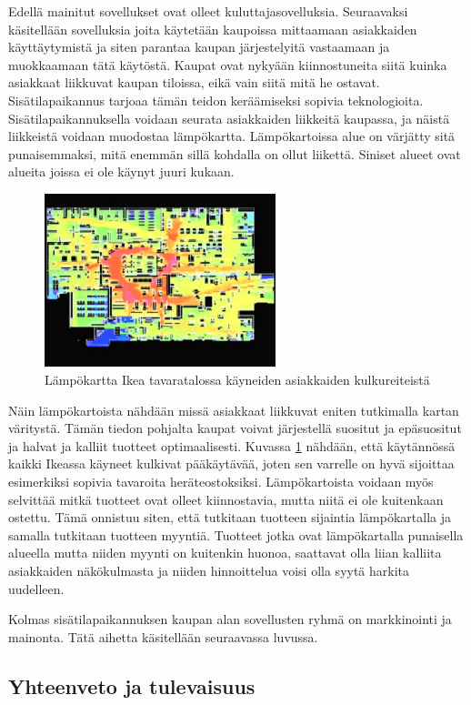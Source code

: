 Edellä mainitut sovellukset ovat olleet kuluttajasovelluksia. Seuraavaksi käsitellään sovelluksia joita käytetään kaupoissa mittaamaan asiakkaiden käyttäytymistä ja siten parantaa kaupan järjestelyitä vastaamaan ja muokkaamaan tätä käytöstä. Kaupat ovat nykyään kiinnostuneita siitä kuinka asiakkaat liikkuvat kaupan tiloissa, eikä vain siitä mitä he ostavat\cite{heat}. Sisätilapaikannus tarjoaa tämän teidon keräämiseksi sopivia teknologioita. Sisätilapaikannuksella voidaan seurata asiakkaiden liikkeitä kaupassa, ja näistä liikkeistä voidaan muodostaa lämpökartta. Lämpökartoissa alue on värjätty sitä punaisemmaksi, mitä enemmän sillä kohdalla on ollut liikettä. Siniset alueet ovat alueita joissa ei ole käynyt juuri kukaan. 
\begin{figure}[htpb]
    \centering
    \includegraphics[width=0.6\textwidth]{ikeaheatmap.png}
    \caption{Lämpökartta Ikea tavaratalossa käyneiden asiakkaiden kulkureiteistä\cite{ikea}}
    \label{ikea}
\end{figure}
Näin lämpökartoista nähdään missä asiakkaat liikkuvat eniten tutkimalla kartan väritystä. Tämän tiedon pohjalta kaupat voivat järjestellä suositut ja epäsuositut ja halvat ja kalliit tuotteet optimaalisesti\cite{heat}.
Kuvassa \ref{ikea} nähdään, että käytännössä kaikki Ikeassa käyneet kulkivat pääkäytävää, joten sen varrelle on hyvä sijoittaa esimerkiksi sopivia tavaroita heräteostoksiksi.
Lämpökartoista voidaan myös selvittää mitkä tuotteet ovat olleet kiinnostavia, mutta niitä ei ole kuitenkaan ostettu. Tämä onnistuu siten, että tutkitaan tuotteen sijaintia lämpökartalla ja samalla tutkitaan tuotteen myyntiä. Tuotteet jotka ovat lämpökartalla punaisella alueella mutta niiden myynti on kuitenkin huonoa, saattavat olla liian kalliita asiakkaiden näkökulmasta ja niiden hinnoittelua voisi olla syytä harkita uudelleen.

Kolmas sisätilapaikannuksen kaupan alan sovellusten ryhmä on markkinointi ja mainonta. Tätä aihetta käsitellään seuraavassa luvussa.

\subsection{Yhteenveto ja tulevaisuus}





